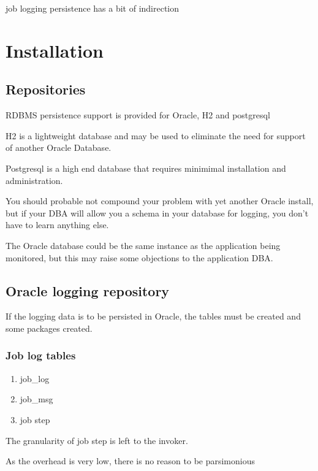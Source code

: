 \documentclass[letterpaper,10pt,english]{sphinxmanual}
\begin{document}
job logging persistence has a bit of indirection


\section{Installation}
\label{index:installation}

\subsection{Repositories}
\label{index:repositories}
RDBMS persistence support is provided for Oracle, H2 and postgresql

H2 is a lightweight database and may be used to eliminate the need for
support of another Oracle Database.

Postgresql is a high end database that requires minimimal installation
and administration.

You should probable not compound your problem with yet another Oracle
install, but if your DBA will allow you a schema in your database for
logging, you don't have to learn anything else.

The Oracle database could be the same instance as the application being
monitored, but this may raise some objections to the application DBA.


\subsection{Oracle logging repository}
\label{index:oracle-logging-repository}
If the logging data is to be persisted in Oracle, the tables must be
created and some packages created.


\subsubsection{Job log tables}
\label{index:job-log-tables}\begin{enumerate}
\item {} 
job\_log

\item {} 
job\_msg

\item {} 
job step

\end{enumerate}

\begin{DUlineblock}{0em}
\item[] The granularity of job step is left to the invoker.
\item[] As the overhead is very low, there is no reason to be parsimonious
\end{DUlineblock}
\end{document}
